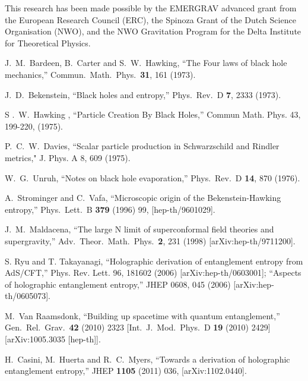 \documentclass[a4paper,12pt]{article}
\begin{document}
This research has been made possible by the EMERGRAV advanced grant from the European 
Research Council (ERC), the Spinoza Grant of the Dutch Science Organisation (NWO), 
and the  NWO Gravitation Program  for the Delta Institute for Theoretical Physics.
\vspace{4cm}

\newpage



\begin{thebibliography}{100}





 J.~M.~Bardeen, B.~Carter and S.~W.~Hawking,
``The Four laws of black hole mechanics,''
 Commun.\ Math.\ Phys.\  {\bf 31}, 161 (1973).

 J.~D.~Bekenstein,
 ``Black holes and entropy,''
 Phys.\ Rev.\  D {\bf 7}, 2333 (1973).

S .~W.~Hawking , ``Particle Creation By Black Holes,''  Commun Math. Phys. 43, 199-220, (1975).

P.~C.~W.~Davies, ``Scalar particle production in Schwarzschild and Rindler metrics," J. Phys. A 8, 609 (1975).

 W.~G.~Unruh,
``Notes on black hole evaporation,''
 Phys.\ Rev.\  D {\bf 14}, 870 (1976).

  A.~Strominger and C.~Vafa,
  ``Microscopic origin of the Bekenstein-Hawking entropy,''
  Phys.\ Lett.\ B {\bf 379} (1996) 99,
  [hep-th/9601029].
  
J.~M.~Maldacena,
 ``The large N limit of superconformal field theories and supergravity,''
Adv.\ Theor.\ Math.\ Phys.\  {\bf 2}, 231 (1998)
 [arXiv:hep-th/9711200].


 S. Ryu and T. Takayanagi, ``Holographic derivation of entanglement entropy from AdS/CFT,'' Phys. Rev. Lett. 96, 181602 (2006) [arXiv:hep-th/0603001];
``Aspects of holographic entanglement entropy,'' JHEP 0608, 045 (2006) [arXiv:hep-th/0605073].

  M.~Van Raamsdonk,
  ``Building up spacetime with quantum entanglement,''
  Gen.\ Rel.\ Grav.\  {\bf 42} (2010) 2323
   [Int.\ J.\ Mod.\ Phys.\ D {\bf 19} (2010) 2429]
  [arXiv:1005.3035 [hep-th]].

  H.~Casini, M.~Huerta and R.~C.~Myers,
  ``Towards a derivation of holographic entanglement entropy,''
  JHEP {\bf 1105} (2011) 036,
  [arXiv:1102.0440].


\end{thebibliography}
\end{document}
